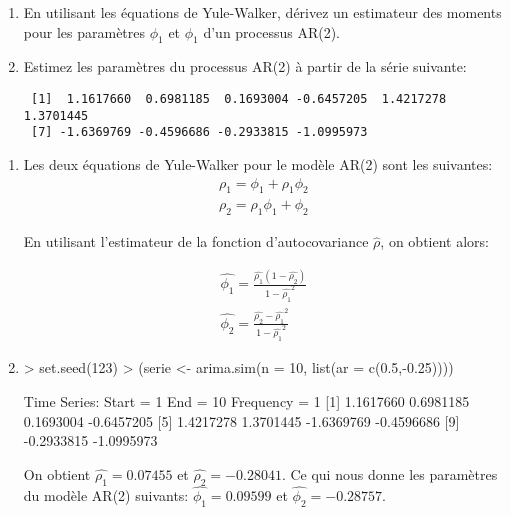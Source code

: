 \begin{exercice}
  \begin{enumerate}
\item En utilisant les équations de Yule-Walker, dérivez un estimateur des moments pour les paramètres $\phi_1$ et $\phi_1$ d'un processus AR(2). \\

\item Estimez les paramètres du processus AR(2) à partir de la série suivante:
\begin{verbatim}
 [1]  1.1617660  0.6981185  0.1693004 -0.6457205  1.4217278  1.3701445
 [7] -1.6369769 -0.4596686 -0.2933815 -1.0995973
\end{verbatim}
\end{enumerate}
\begin{sol}
  \begin{enumerate}
\item 
Les deux équations de Yule-Walker pour le modèle AR(2) sont les suivantes:
\begin{align*}
\rho_1 = \phi_1 + \rho_1 \phi_2 \\
\rho_2 = \rho_1\phi_1 + \phi_2
\end{align*}

En utilisant l'estimateur de la fonction d'autocovariance $\hat{\rho}$, on obtient alors:

\begin{align*}
\hat{\phi_1} = \frac{\hat{\rho_1}(1-\hat{\rho_2})}{1-\hat{\rho_1}^2} \\
\hat{\phi_2} = \frac{\hat{\rho_2} - \hat{\rho_1}^2}{1-\hat{\rho_1}^2}
\end{align*}


\item

\begin{Schunk}
\begin{Sinput}
> set.seed(123)
> (serie <- arima.sim(n = 10, list(ar = c(0.5,-0.25))))
\end{Sinput}
\begin{Soutput}
Time Series:
Start = 1 
End = 10 
Frequency = 1 
 [1]  1.1617660  0.6981185  0.1693004 -0.6457205
 [5]  1.4217278  1.3701445 -1.6369769 -0.4596686
 [9] -0.2933815 -1.0995973
\end{Soutput}
\end{Schunk}

On obtient $ = 0.07455$ et $ = -0.28041$. 
Ce qui nous donne les paramètres du modèle AR(2) suivants:
$ = 0.09599$ et 
$ = -0.28757$.
\end{enumerate}
\end{sol}
\end{exercice}


